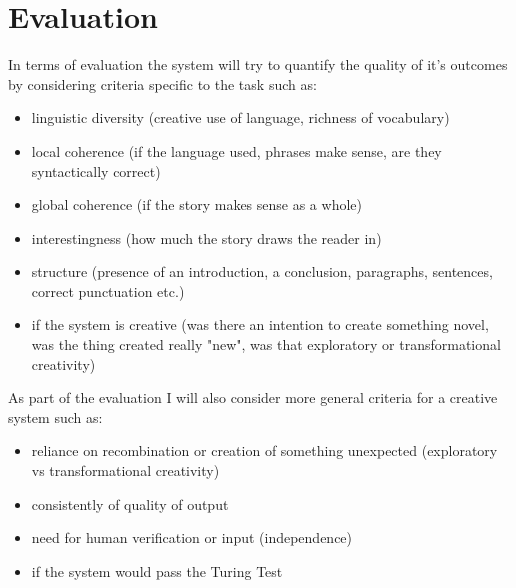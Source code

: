 \documentclass[a4paper, 12pt, notitlepage]{article}
\begin{document}
\vspace{0.2cm}

\section*{Evaluation}

In terms of evaluation the system will try to quantify the quality of it's
outcomes by considering criteria specific to the task such as:

\begin{itemize}		
  \item linguistic diversity (creative use of language, richness of vocabulary)
  \item local coherence (if the language used, phrases make sense, are they syntactically correct)
  \item global coherence (if the story makes sense as a whole)
  \item interestingness (how much the story draws the reader in)
  \item structure (presence of an introduction, a conclusion, paragraphs, sentences, correct punctuation etc.)
  \item if the system is creative (was there an intention to create something novel, was the thing created really "new", was that exploratory or transformational creativity) \\ 
\end{itemize}		

\hspace{-0.8cm}
As part of the evaluation I will also consider more general criteria for a creative system such as:

\begin{itemize}		
  \item reliance on recombination or creation of something unexpected (exploratory vs transformational creativity)
  \item consistently of quality of output
  \item need for human verification or input (independence)
  \item if the system would pass the Turing Test 
\end{itemize}		
\end{document}
